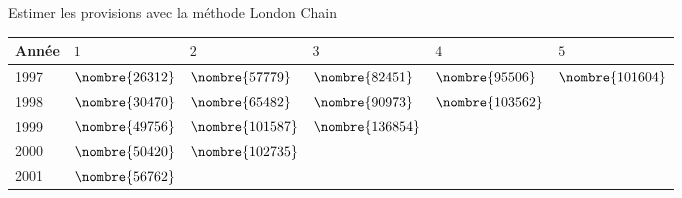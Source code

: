 \begin{exemple}
  Estimer les provisions avec la méthode London Chain
  \begin{center}
    \begin{tabular}{|l|l l l l l|}\hline
      Année & $1$ & $2$ & $3$ & $4$ & $5$  \\ \hline
      1997 &$\nombre{26312}$&	$\nombre{57779}$&	$\nombre{82451}$&	$\nombre{95506}$&	$\nombre{101604}$\\
      1998 &$\nombre{30470}$&	$\nombre{65482}$&	$\nombre{90973}$&	$\nombre{103562}$&	\\
      1999 &$\nombre{49756}$&	$\nombre{101587}$&	$\nombre{136854}$&	&	\\
      2000 &$\nombre{50420}$&	$\nombre{102735}$&	& &	\\
      2001 &$\nombre{56762}$&	&&&\\ \hline
    \end{tabular}
  \end{center}


\end{exemple}
